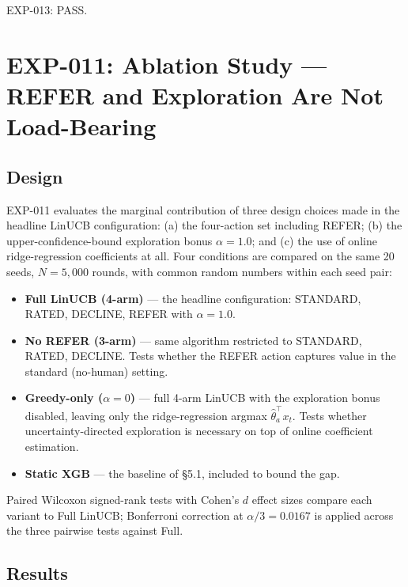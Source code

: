EXP-013: PASS.

\section{EXP-011: Ablation Study --- REFER and Exploration Are Not Load-Bearing}\label{exp-011-ablation-study-refer-and-exploration-are-not-load-bearing}

\subsection{Design}\label{design}

EXP-011 evaluates the marginal contribution of three design choices made in the headline LinUCB configuration: (a) the four-action set including REFER; (b) the upper-confidence-bound exploration bonus \(\alpha = 1.0\); and (c) the use of online ridge-regression coefficients at all. Four conditions are compared on the same 20 seeds, \(N = 5{,}000\) rounds, with common random numbers within each seed pair:

\begin{itemize}
\tightlist
\item
  \textbf{Full LinUCB (4-arm)} --- the headline configuration: STANDARD, RATED, DECLINE, REFER with \(\alpha = 1.0\).
\item
  \textbf{No REFER (3-arm)} --- same algorithm restricted to STANDARD, RATED, DECLINE. Tests whether the REFER action captures value in the standard (no-human) setting.
\item
  \textbf{Greedy-only (\(\alpha = 0\))} --- full 4-arm LinUCB with the exploration bonus disabled, leaving only the ridge-regression argmax \(\hat\theta_a^\top x_t\). Tests whether uncertainty-directed exploration is necessary on top of online coefficient estimation.
\item
  \textbf{Static XGB} --- the baseline of §5.1, included to bound the gap.
\end{itemize}

Paired Wilcoxon signed-rank tests with Cohen's \(d\) effect sizes compare each variant to Full LinUCB; Bonferroni correction at \(\alpha/3 = 0.0167\) is applied across the three pairwise tests against Full.

\subsection{Results}\label{results-2}

\label{tab:5.7.1}


